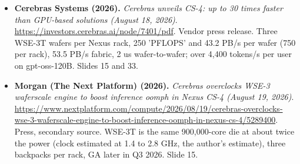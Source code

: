 \begin{itemize}[leftmargin=1.2em,itemsep=3pt]
\item \textbf{Cerebras Systems (2026).} \textit{Cerebras unveils CS-4: up to 30 times faster than GPU-based solutions (August 18, 2026)}. \url{https://investors.cerebras.ai/node/7401/pdf}. Vendor press release. Three WSE-3T wafers per Nexus rack, 250 'PFLOPS' and 43.2 PB/s per wafer (750 per rack), 53.5 PB/s fabric, 2 us wafer-to-wafer; over 4,400 tokens/s per user on gpt-oss-120B. Slides 15 and 33.
\item \textbf{Morgan (The Next Platform) (2026).} \textit{Cerebras overclocks WSE-3 waferscale engine to boost inference oomph in Nexus CS-4 (August 19, 2026)}. \url{https://www.nextplatform.com/compute/2026/08/19/cerebras-overclocks-wse-3-waferscale-engine-to-boost-inference-oomph-in-nexus-cs-4/5289400}. Press, secondary source. WSE-3T is the same 900,000-core die at about twice the power (clock estimated at 1.4 to 2.8 GHz, the author's estimate), three backpacks per rack, GA later in Q3 2026. Slide 15.
\end{itemize}
